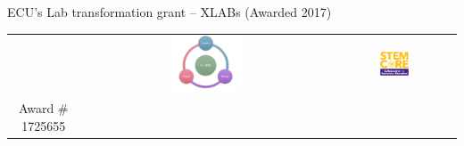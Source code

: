 \documentclass[aspectratio=169,shadow=true]{beamer}
\begin{document}
\begin{frame}{ECU's Lab transformation grant -- XLABs (Awarded 2017)}
\begin{minipage}[b]{0.6\textwidth}
\begin{center}
\begin{tabular}{ccc}
        &\includegraphics[width=0.3\textwidth,trim = 60 0 70 0, clip]{./logos/xlabsLogo.png}%
        &\includegraphics[width=0.25\textwidth]{./logos/stemCoreLogoTall.pdf}\\
          Award \# 1725655
      \end{tabular}
    \end{center}
  \end{minipage}

  
  \begin{minipage}{0.2\textwidth}
  \end{minipage}\hspace{0.4in}%
  \begin{minipage}{0.5\textwidth}%
  \end{minipage}
\end{frame}
\end{document}
